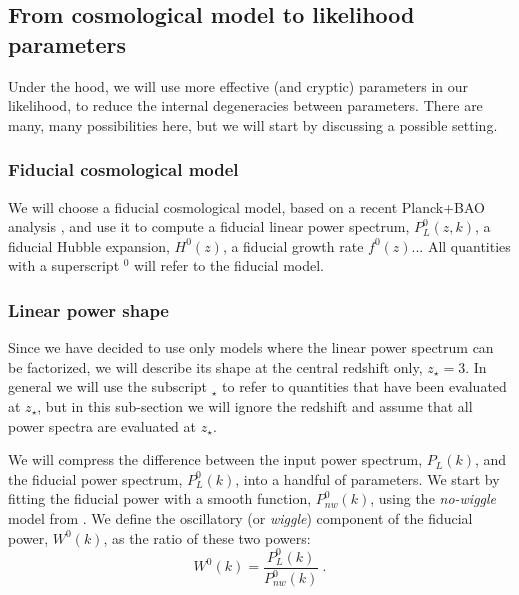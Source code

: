 \subsection{From cosmological model to likelihood parameters}

Under the hood, we will use more effective (and cryptic) parameters in our 
likelihood, to reduce the internal degeneracies between parameters.
There are many, many possibilities here, but we will start by discussing a 
possible setting. 

\subsubsection{Fiducial cosmological model}
 
We will choose a fiducial cosmological model, based on a recent Planck+BAO 
analysis \cite{Planck2015}, and use it to compute a fiducial linear power 
spectrum, $P_L^0(z,k)$, a fiducial Hubble expansion, $H^0(z)$, a fiducial 
growth rate $f^0(z)$...
All quantities with a superscript $^0$ will refer to the fiducial model.

\subsubsection{Linear power shape}

Since we have decided to use only models where the linear power spectrum 
can be factorized, we will describe its shape at the central redshift only, 
$z_\star=3$. 
In general we will use the subscript $_\star$ to refer to quantities that 
have been evaluated at $z_\star$, but in this sub-section we will ignore 
the redshift and assume that all power spectra are evaluated at $z_\star$.

We will compress the difference between the input power spectrum, $P_L(k)$, 
and the fiducial power spectrum, $P^0_L(k)$, into a handful of parameters. 
We start by fitting the fiducial power with a smooth function, 
$P^0_{nw}(k)$, using the \textit{no-wiggle} model from \cite{Eisenstein1998}.
We define the oscillatory (or \textit{wiggle}) component of the 
fiducial power, $W^0(k)$, as the ratio of these two powers:
\begin{equation}
 W^0(k) = \frac{P^0_L(k)}{P^0_{nw}(k)} ~.
\end{equation} 

